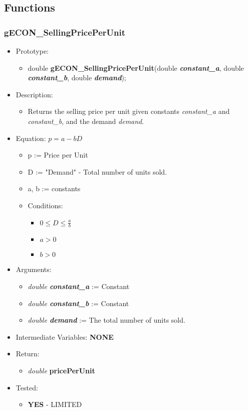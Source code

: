 \documentclass{article}
\begin{document}
{{{{{{%
\subsection{Functions}

\subsubsection{gECON\_SellingPricePerUnit}
\begin{itemize}
\item Prototype:
	\begin{itemize}
	\item double \textbf{gECON\_SellingPricePerUnit}(double \textbf{\textit{constant\_a}}, double \textbf{\textit{constant\_b}}, double \textbf{\textit{demand}});
	\end{itemize}
\item Description:
	\begin{itemize}
	\item Returns the selling price per unit given constants \textit{constant\_a} and \textit{constant\_b}, and the demand \textit{demand}.
	\end{itemize}
\item Equation:     $p = a - bD$
	\begin{itemize}
	\item p := Price per Unit
	\item D := "Demand" - Total number of units sold.
	\item a, b := constants
	\item Conditions:
		\begin{itemize}
		\item $0 \le D \le \frac{a}{b}$
		\item $a > 0$
		\item $b > 0$
		\end{itemize}
	\end{itemize}
\item Arguments:
	\begin{itemize}[noitemsep]
	\item \textit{double \textbf{constant\_a}} := Constant
	\item \textit{double \textbf{constant\_b}} := Constant
	\item \textit{double \textbf{demand}} := The total number of units sold.
	\end{itemize} 
\item Intermediate Variables: \textbf{NONE}
\item Return:
	\begin{itemize}
	\item \textit{double} \textbf{pricePerUnit}
	\end{itemize}
\item Tested:
	\begin{itemize}
	\item \textbf{YES} - LIMITED
	\end{itemize}
\end{itemize}

}}}}}}
\end{document}
